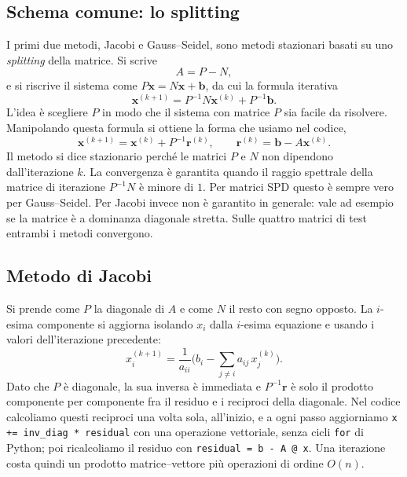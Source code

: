 \documentclass[11pt,a4paper]{article}
\begin{document}
\subsection{Schema comune: lo splitting}
I primi due metodi, Jacobi e Gauss--Seidel, sono metodi stazionari basati su uno
\emph{splitting} della matrice. Si scrive
\[
A=P-N,
\]
e si riscrive il sistema come $P\mathbf{x}=N\mathbf{x}+\mathbf{b}$, da cui la
formula iterativa
\[
\mathbf{x}^{(k+1)}=P^{-1}N\mathbf{x}^{(k)}+P^{-1}\mathbf{b}.
\]
L'idea è scegliere $P$ in modo che il sistema con matrice $P$ sia facile da
risolvere. Manipolando questa formula si ottiene la forma che usiamo nel
codice,
\[
\mathbf{x}^{(k+1)}=\mathbf{x}^{(k)}+P^{-1}\mathbf{r}^{(k)},
\qquad \mathbf{r}^{(k)}=\mathbf{b}-A\mathbf{x}^{(k)}.
\]
Il metodo si dice stazionario perché le matrici $P$ e $N$ non dipendono
dall'iterazione $k$. La convergenza è garantita quando il raggio spettrale della
matrice di iterazione $P^{-1}N$ è minore di $1$. Per matrici SPD questo è sempre
vero per Gauss--Seidel. Per Jacobi invece non è garantito in generale: vale ad
esempio se la matrice è a dominanza diagonale stretta. Sulle quattro matrici di
test entrambi i metodi convergono.

\subsection{Metodo di Jacobi}
Si prende come $P$ la diagonale di $A$ e come $N$ il resto con segno opposto. La
$i$-esima componente si aggiorna isolando $x_i$ dalla $i$-esima equazione e
usando i valori dell'iterazione precedente:
\[
x_i^{(k+1)}=\frac{1}{a_{ii}}\Big(b_i-\sum_{j\neq i} a_{ij}\,x_j^{(k)}\Big).
\]
Dato che $P$ è diagonale, la sua inversa è immediata e $P^{-1}\mathbf{r}$ è solo
il prodotto componente per componente fra il residuo e i reciproci della
diagonale. Nel codice calcoliamo questi reciproci una volta sola, all'inizio, e
a ogni passo aggiorniamo \texttt{x += inv\_diag * residual} con una operazione
vettoriale, senza cicli \texttt{for} di Python; poi ricalcoliamo il residuo con
\texttt{residual = b - A @ x}. Una iterazione costa quindi un prodotto
matrice--vettore più operazioni di ordine $O(n)$.
\end{document}
